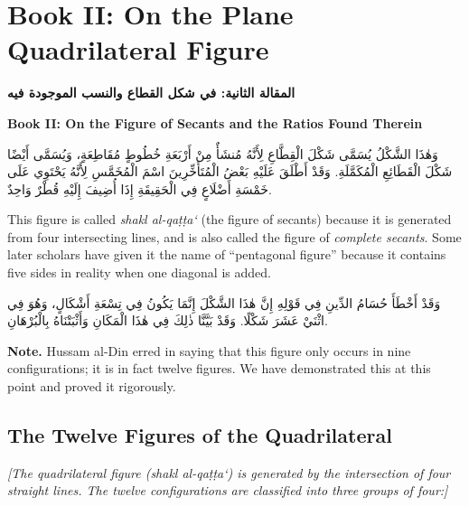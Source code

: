\documentclass[11pt,a4paper]{article}
\theoremstyle{plain}
\theoremstyle{definition}
\theoremstyle{remark}
\newcommand{\ar}[1]{{\arabicfont\beginR #1\endR}}
\newcommand{\bilingualpair}[2]{%
  \par\noindent
  \begin{minipage}[t]{0.48\textwidth}
  #1
  \end{minipage}%
  \hfill
  \begin{minipage}[t]{0.48\textwidth}
  \vspace*{0pt}#2
  \end{minipage}\par\vspace{0.3cm}%
}
\begin{document}
\clearpage


\section{Book II: On the Plane Quadrilateral Figure}
\label{sec:book2}

\bilingualpair{\noindent\textcolor{arabicblue}{\textbf{\ar{المقالة الثانية: في شكل القطاع والنسب الموجودة فيه}}}}{\noindent\textcolor{sectioncolor}{\textbf{Book II: On the Figure of Secants and the Ratios Found Therein}}}

\vspace{0.3cm}

\bilingualpair{\ar{وَهٰذَا الشَّكْلُ يُسَمَّى شَكْلَ الْقِطَّاعِ لِأَنَّهُ مُنشَأٌ مِنْ أَرْبَعَةِ خُطُوطٍ مُقَاطِعَةٍ، وَيُسَمَّى أَيْضًا شَكْلَ الْقَطَائِعِ الْمُكَمَّلَةِ. وَقَدْ أَطْلَقَ عَلَيْهِ بَعْضُ الْمُتَأَخِّرِينَ اسْمَ الْمُخَمَّسِ لِأَنَّهُ يَحْتَوِي عَلَى خَمْسَةِ أَضْلَاعٍ فِي الْحَقِيقَةِ إِذَا أُضِيفَ إِلَيْهِ قُطْرٌ وَاحِدٌ.}}{\noindent This figure is called \textit{shakl al-qa\d{t}\d{t}a`} (the figure of secants) because it is generated from four intersecting lines, and is also called the figure of \textit{complete secants}. Some later scholars have given it the name of ``pentagonal figure'' because it contains five sides in reality when one diagonal is added.}

\vspace{0.3cm}

\bilingualpair{\ar{وَقَدْ أَخْطَأَ حُسَامُ الدِّينِ فِي قَوْلِهِ إِنَّ هٰذَا الشَّكْلَ إِنَّمَا يَكُونُ فِي تِسْعَةِ أَشْكَالٍ، وَهُوَ فِي اثْنَيْ عَشَرَ شَكْلًا. وَقَدْ بَيَّنَّا ذٰلِكَ فِي هٰذَا الْمَكَانِ وَأَثْبَتْنَاهُ بِالْبُرْهَانِ.}}{\noindent\textbf{Note.} Hussam al-Din erred in saying that this figure only occurs in nine configurations; it is in fact twelve figures. We have demonstrated this at this point and proved it rigorously.}

\vspace{0.5cm}

\subsection{The Twelve Figures of the Quadrilateral}
\label{sec:12figs}

\noindent\textit{[The quadrilateral figure (\textit{shakl al-qa\d{t}\d{t}a`}) is generated by the intersection of four straight lines. The twelve configurations are classified into three groups of four:]}
\end{document}
